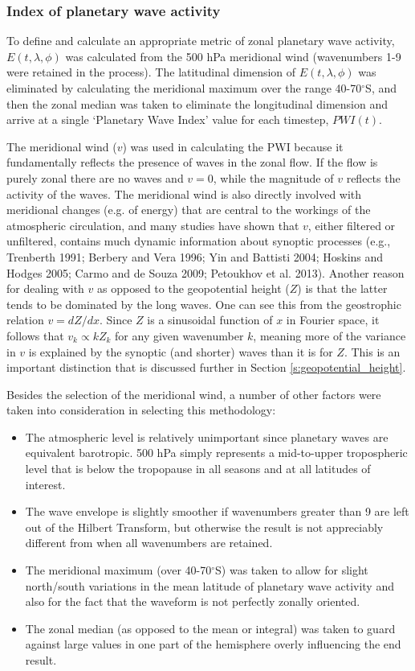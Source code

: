 \subsubsection{Index of planetary wave activity}

To define and calculate an appropriate metric of zonal planetary wave activity, $E(t,\lambda,\phi)$ was calculated from the 500 hPa meridional wind (wavenumbers 1-9 were retained in the process). The latitudinal dimension of $E(t,\lambda,\phi)$ was eliminated by calculating the meridional maximum over the range 40-70$^{\circ}$S, and then the zonal median was taken to eliminate the longitudinal dimension and arrive at a single `Planetary Wave Index' value for each timestep, $PWI(t)$. 

The meridional wind ($v$) was used in calculating the PWI because it fundamentally reflects the presence of waves in the zonal flow. If the flow is purely zonal there are no waves and $v = 0$, while the magnitude of $v$ reflects the activity of the waves. The meridional wind is also directly involved with meridional changes (e.g. of energy) that are central to the workings of the atmospheric circulation, and many studies have shown that $v$, either filtered or unfiltered, contains much dynamic information about synoptic processes (e.g., Trenberth 1991; Berbery and Vera 1996; Yin and Battisti 2004; Hoskins and Hodges 2005; Carmo and de Souza 2009; Petoukhov et al. 2013). Another reason for dealing with $v$ as opposed to the geopotential height ($Z$) is that the latter tends to be dominated by the long waves. One can see this from the geostrophic relation $v = dZ / dx$. Since $Z$ is a sinusoidal function of $x$ in Fourier space, it follows that $v_k \propto k Z_k$ for any given wavenumber $k$, meaning more of the variance in $v$ is explained by the synoptic (and shorter) waves than it is for $Z$. This is an important distinction that is discussed further in Section \ref{s:geopotential_height}.

Besides the selection of the meridional wind, a number of other factors were taken into consideration in selecting this methodology:
\begin{itemize}
\item The atmospheric level is relatively unimportant since planetary waves are equivalent barotropic. 500 hPa simply represents a mid-to-upper tropospheric level that is below the tropopause in all seasons and at all latitudes of interest.
\item The wave envelope is slightly smoother if wavenumbers greater than 9 are left out of the Hilbert Transform, but otherwise the result is not appreciably different from when all wavenumbers are retained.
\item The meridional maximum (over 40-70$^{\circ}$S) was taken to allow for slight north/south variations in the mean latitude of planetary wave activity and also for the fact that the waveform is not perfectly zonally oriented. 
\item The zonal median (as opposed to the mean or integral) was taken to guard against large values in one part of the hemisphere overly influencing the end result.
\end{itemize}

